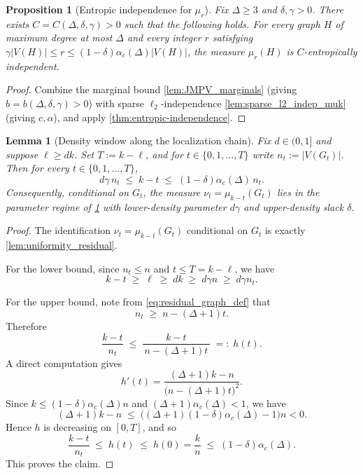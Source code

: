 \documentclass[11pt,reqno,letterpaper]{amsart}
\numberwithin{equation}{section}
\newtheorem{proposition}[theorem]{Proposition}
\newtheorem{lemma}[theorem]{Lemma}
\theoremstyle{definition}
\begin{document}
\begin{proposition}[Entropic independence for $\mu_r$]
\label{prop:EI_muk}
Fix $\Delta\ge 3$ and $\delta,\gamma>0$. There exists $C=C(\Delta,\delta,\gamma)>0$ such that the following holds.
For every graph $H$ of maximum degree at most $\Delta$ and every integer $r$ satisfying
$\gamma|V(H)|\le r \le (1-\delta)\alpha_c(\Delta)|V(H)|$, the measure $\mu_r(H)$ is $C$-entropically independent.
\end{proposition}

\begin{proof}
Combine the marginal bound \cref{lem:JMPV_marginals} (giving $b=b(\Delta,\delta,\gamma)>0$)
with sparse $\ell_2$-independence \cref{lem:sparse_l2_indep_muk} (giving $c,\alpha$),
and apply \cref{thm:entropic-independence}.
\end{proof}

\begin{lemma}[Density window along the localization chain]
\label{lem:residual_density_window}
Fix $d\in(0,1]$ and suppose $\ell\ge dk$. Set $T:=k-\ell$, and for $t\in\{0,1,\dots,T\}$ write
$n_t:=|V(G_t)|$.
Then for every $t\in\{0,1,\dots,T\}$,
\[
d\gamma\, n_t \;\le\; k-t \;\le\; (1-\delta)\alpha_c(\Delta)\, n_t.
\]
Consequently, conditional on $G_t$, the measure $\nu_t=\mu_{k-t}(G_t)$ lies in the parameter regime of
\cref{prop:EI_muk} with lower-density parameter $d\gamma$ and upper-density slack $\delta$.
\end{lemma}

\begin{proof}
The identification $\nu_t=\mu_{k-t}(G_t)$ conditional on $G_t$ is exactly
\cref{lem:uniformity_residual}.

For the lower bound, since $n_t\le n$ and $t\le T=k-\ell$, we have
\[
k-t \;\ge\; \ell \;\ge\; dk \;\ge\; d\gamma n \;\ge\; d\gamma n_t.
\]

For the upper bound, note from \eqref{eq:residual_graph_def} that
\[
n_t \;\ge\; n-(\Delta+1)t.
\]
Therefore
\[
\frac{k-t}{n_t}
\;\le\;
\frac{k-t}{\,n-(\Delta+1)t\,}
\;=:\;
h(t).
\]
A direct computation gives
\[
h'(t)
=
\frac{(\Delta+1)k-n}{\bigl(n-(\Delta+1)t\bigr)^2}.
\]
Since $k\le (1-\delta)\alpha_c(\Delta)n$ and $(\Delta+1)\alpha_c(\Delta)<1$, we have
\[
(\Delta+1)k-n
\;\le\;
\bigl((\Delta+1)(1-\delta)\alpha_c(\Delta)-1\bigr)n
<0.
\]
Hence $h$ is decreasing on $[0,T]$, and so
\[
\frac{k-t}{n_t}
\;\le\;
h(t)
\;\le\;
h(0)
=
\frac{k}{n}
\;\le\;
(1-\delta)\alpha_c(\Delta).
\]
This proves the claim.
\end{proof}
\end{document}
